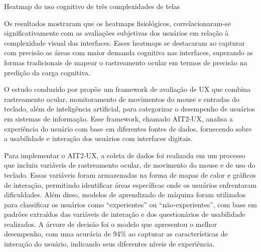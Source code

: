 \begin{photograph}[H]
    \centering
    \caption{Heatmap do uso cognitivo de três complexidades de telas}%
    \label{phot:}
    \end{photograph}


Os resultados mostraram que os heatmaps fisiológicos, correlacionaram-se significativamente com as avaliações subjetivas dos usuários em relação à complexidade visual das interfaces. Esses heatmaps se destacaram ao capturar com precisão as áreas com maior demanda cognitiva nas interfaces, superando as formas tradicionais de mapear o rastreamento ocular em termos de precisão na predição da carga cognitiva.

O estudo conduzido por \textcite{SOUZA2021} propõe um framework de avaliação de UX que combina rastreamento ocular, monitoramento de movimentos do mouse e entradas do teclado, além de inteligência artificial, para categorizar o desempenho de usuários em sistemas de informação. Esse framework, chamado AIT2-UX, analisa a experiência do usuário com base em diferentes fontes de dados, fornecendo sobre a usabilidade e interação dos usuários com interfaces digitais.

Para implementar o AIT2-UX, a coleta de dados foi realizada em um processo que incluiu variáveis de rastreamento ocular, de movimento do mouse e de uso do teclado. Essas variáveis foram armazenadas na forma de mapas de calor e gráficos de interação, permitindo identificar áreas específicas onde os usuários enfrentaram dificuldades. Além disso, modelos de aprendizado de máquina foram utilizados para classificar os usuários como “experientes” ou “não-experientes”, com base em padrões extraídos das variáveis de interação e dos questionários de usabilidade realizados. A árvore de decisão foi o modelo que apresentou o melhor desempenho, com uma acurácia de 94\% ao capturar as características de interação do usuário, indicando seus diferentes níveis de experiência.

